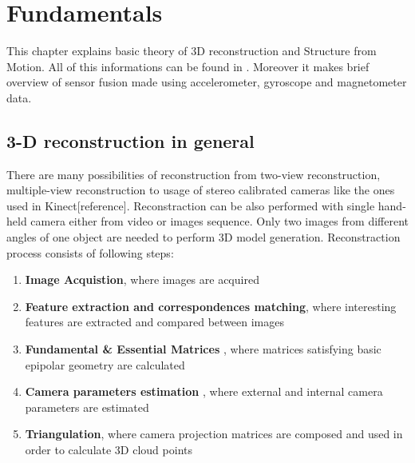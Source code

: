 
\chapter{Fundamentals} %
This chapter explains basic theory of 3D reconstruction and Structure from Motion. All of this informations can be found in \cite{HartleyMultipleView}. Moreover it makes brief overview of sensor fusion made using accelerometer, gyroscope and magnetometer data. 

\section{3-D reconstruction in general}
There are many possibilities of reconstruction from two-view reconstruction, multiple-view reconstruction to usage of stereo calibrated cameras like the ones used in Kinect[reference]. Reconstraction can be also performed with single hand-held camera either from video or images sequence. Only two images from different angles of one object are needed to perform 3D model generation. Reconstraction process consists of following steps:
\begin{enumerate}
\item \textbf{Image Acquistion}, where images are acquired 
\item \textbf{Feature extraction and correspondences matching}, where interesting features are extracted and compared between images
\item \textbf{Fundamental \& Essential Matrices} , where matrices satisfying basic epipolar geometry are calculated
\item \textbf{Camera parameters estimation} , where external and internal camera parameters are estimated
\item \textbf{Triangulation}, where camera projection matrices are composed and used in order to calculate 3D cloud points
\end{enumerate}
